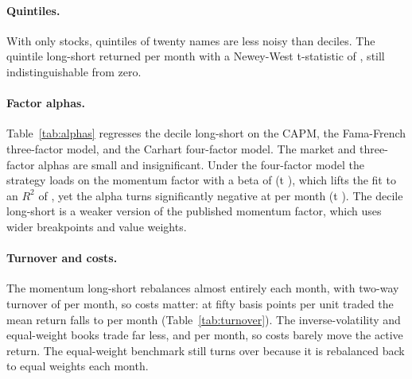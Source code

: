 \documentclass[11pt]{article}
\begin{document}
\paragraph{Quintiles.}
With only \nStocks{} stocks, quintiles of twenty names are less noisy than deciles. The quintile
long-short returned \quintMean{} per month with a Newey-West t-statistic of \quintTnw{}, still
indistinguishable from zero.

\paragraph{Factor alphas.}
Table~\ref{tab:alphas} regresses the decile long-short on the CAPM, the Fama-French three-factor
model, and the Carhart four-factor model. The market and three-factor alphas are small and
insignificant. Under the four-factor model the strategy loads on the momentum factor with a beta of
\ffFourWmlBeta{} (t \ffFourWmlT{}), which lifts the fit to an $R^2$ of \ffFourRsq{}, yet the alpha
turns significantly negative at \ffFourAlpha{} per month (t \ffFourAlphaT{}). The decile long-short
is a weaker version of the published momentum factor, which uses wider breakpoints and value
weights.

\begin{table}[htbp]
  \centering
  \caption{Factor regressions of the momentum long-short. Alpha is per month; t-statistics use
  Newey-West standard errors.}
  \label{tab:alphas}
  
\end{table}

\paragraph{Turnover and costs.}
The momentum long-short rebalances almost entirely each month, with two-way turnover of
\momTurnover{} per month, so costs matter: at fifty basis points per unit traded the mean return
falls to \momNetFifty{} per month (Table~\ref{tab:turnover}). The inverse-volatility and
equal-weight books trade far less, \ivTurnover{} and \ewTurnover{} per month, so costs barely move
the active return. The equal-weight benchmark still turns over because it is rebalanced back to
equal weights each month.

\begin{table}[htbp]
  \centering
  \caption{Two-way turnover and mean net return after costs, per month.}
  \label{tab:turnover}
  
\end{table}
\end{document}
